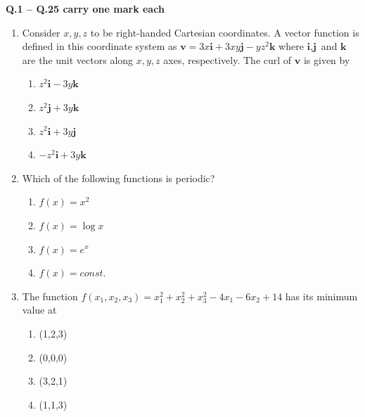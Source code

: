 \documentclass{article}
\begin{document}
\textbf{Q.1 -- Q.25 carry one mark each}

\begin{enumerate}

\item Consider $x,y,z$ to be right-handed Cartesian coordinates. A vector function is defined in this coordinate system as $\textbf{v} = 3x\textbf{i} + 3xy\textbf{j} - yz^2\textbf{k}$ where $\textbf{i}, \textbf{j}$ and $\textbf{k}$ are the unit vectors along $x,y,z$ axes, respectively. The curl of $\textbf{v}$ is given by
\begin{multicols}{4}
\begin{enumerate}
\item $z^2\textbf{i} - 3y\textbf{k}$
\item $z^2\textbf{j} + 3y\textbf{k}$
\item $z^2\textbf{i} + 3y\textbf{j}$
\item $-z^2\textbf{i} + 3y\textbf{k}$
\end{enumerate}
\end{multicols}

\item Which of the following functions is periodic?
\begin{multicols}{4}
\begin{enumerate}
\item $f(x) = x^2$
\item $f(x) = \log x$
\item $f(x) = e^x$
\item $f(x) = const.$
\end{enumerate}
\end{multicols}

\item The function $f(x_1,x_2,x_3)=x_1^2+x_2^2+x_3^2-4x_1-6x_2+14$ has its minimum value at
\begin{multicols}{4}
\begin{enumerate}
\item (1,2,3)
\item (0,0,0)
\item (3,2,1)
\item (1,1,3)
\end{enumerate}
\end{multicols}


\end{enumerate}
\end{document}
